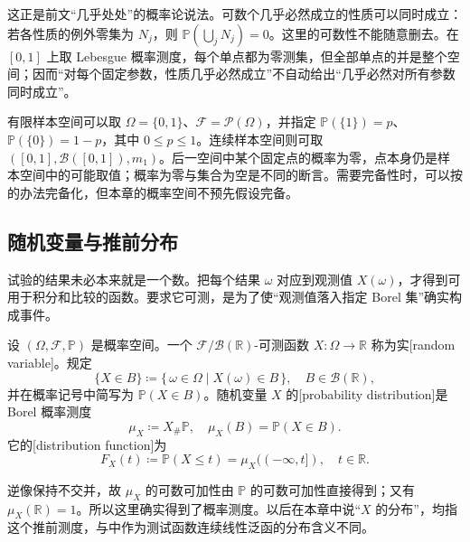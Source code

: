 这正是前文“几乎处处”的概率论说法。可数个几乎必然成立的性质可以同时成立：若各性质的例外零集为 \(N_j\)，则 \(\mathbb P(\bigcup_jN_j)=0\)。这里的可数性不能随意删去。在 \([0,1]\) 上取 Lebesgue 概率测度，每个单点都为零测集，但全部单点的并是整个空间；因而“对每个固定参数，性质几乎必然成立”不自动给出“几乎必然对所有参数同时成立”。

\ProseParagraphBreak

有限样本空间可以取 \(\Omega=\{0,1\}\)、\(\mathcal F=\mathcal P(\Omega)\)，并指定 \(\mathbb P(\{1\})=p\)、\(\mathbb P(\{0\})=1-p\)，其中 \(0\leq p\leq1\)。连续样本空间则可取 \(([0,1],\mathcal B([0,1]),m_1)\)。后一空间中某个固定点的概率为零，点本身仍是样本空间中的可能取值；概率为零与集合为空是不同的断言。需要完备性时，可以按的办法完备化，但本章的概率空间不预先假设完备。

\subsection{随机变量与推前分布}
\label{b1:subsec:300102}

试验的结果未必本来就是一个数。把每个结果 \(\omega\) 对应到观测值 \(X(\omega)\)，才得到可用于积分和比较的函数。要求它可测，是为了使“观测值落入指定 Borel 集”确实构成事件。

\begin{definition}\label{b1:def:30-random-variable}
设 \((\Omega,\mathcal F,\mathbb P)\) 是概率空间。一个 \(\mathcal F/\mathcal B(\mathbb R)\)-可测函数 \(X:\Omega\to\mathbb R\) 称为实[random variable]。规定
\[
 \{X\in B\}\coloneqq\{\,\omega\in\Omega\mid X(\omega)\in B\,\},
 \quad B\in\mathcal B(\mathbb R),
\]
并在概率记号中简写为 \(\mathbb P(X\in B)\)。随机变量 \(X\) 的[probability distribution]是 Borel 概率测度
\[
 \mu_X\coloneqq X_\#\mathbb P,
 \quad \mu_X(B)=\mathbb P(X\in B).
\]
它的[distribution function]为
\[
 F_X(t)\coloneqq\mathbb P(X\leq t)=\mu_X(({-\infty},t]),
 \quad t\in\mathbb R.
\]
\end{definition}

逆像保持不交并，故 \(\mu_X\) 的可数可加性由 \(\mathbb P\) 的可数可加性直接得到；又有 \(\mu_X(\mathbb R)=1\)。所以这里确实得到了概率测度。以后在本章中说“\(X\) 的分布”，均指这个推前测度，与中作为测试函数连续线性泛函的分布含义不同。

\ProseParagraphBreak

